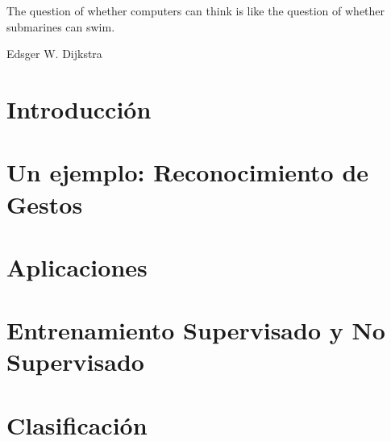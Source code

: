 \epigraph{The question of whether computers can think is like the question of whether submarines can swim. }{Edsger W. Dijkstra}







\section{Introducción}

\section{Un ejemplo: Reconocimiento de Gestos}

\section{Aplicaciones}

\section{Entrenamiento Supervisado y No Supervisado}

\section{Clasificación}

